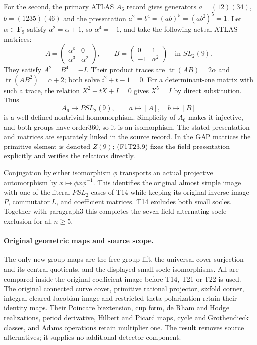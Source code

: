 For the second, the primary ATLAS \(A_6\) record
gives generators \(a=(12)(34)\),
\(b=(1235)(46)\) and the presentation
\(a^2=b^4=(ab)^5=(ab^2)^5=1\).
Let \(\alpha\in\mathbf F_9\) satisfy
\(\alpha^2=\alpha+1\), so \(\alpha^4=-1\),
and take the following actual ATLAS matrices:
\[
 A=\begin{pmatrix}\alpha^6&0\\\alpha^3&\alpha^2\end{pmatrix},
 \qquad
 B=\begin{pmatrix}0&1\\-1&\alpha^2\end{pmatrix}
                  \quad\text{in }SL_2(9).
 \tag{F1T23.9}
\]
They satisfy \(A^2=B^4=-I\).
Their product traces are
\(\operatorname{tr}(AB)=2\alpha\) and
\(\operatorname{tr}(AB^2)=\alpha+2\);
both solve \(t^2+t-1=0\). For a determinant-one
matrix with such a trace, the relation
\(X^2-tX+I=0\) gives \(X^5=I\) by direct
substitution. Thus
\[
        A_6\longrightarrow PSL_2(9),
                   \qquad a\longmapsto[A],\quad
                          b\longmapsto[B]
 \tag{F1T23.10}
\]
is a well-defined nontrivial homomorphism. Simplicity
of \(A_6\) makes it injective, and both groups
have order360, so it is an isomorphism. The stated
presentation and matrices are separately linked in
the source record. In the GAP matrices the primitive
element is denoted \(Z(9)\); (F1T23.9) fixes the
field presentation explicitly and verifies the
relations directly.

Conjugation by either isomorphism \(\phi\)
transports an actual projective automorphism by
\(x\mapsto\phi x\phi^{-1}\). This identifies
the original almost simple image with one of the
literal \(PSL_2\) cases of T14 while keeping its
original inverse image \(P\), commutator \(L\),
and coefficient matrices. T14 excludes both small
socles. Together with paragraph3 this completes the
seven-field alternating-socle exclusion for all
\(n\ge5\).

\paragraph{Original geometric maps and source scope.}
The only new group maps are the free-group lift,
the universal-cover surjection and its central
quotients, and the displayed small-socle
isomorphisms. All are compared inside the original
coefficient image before T14, T21 or T22 is used.
The original connected curve cover, primitive
rational projector, sixfold corner, integral-cleared
Jacobian image and restricted theta polarization
retain their identity maps. Their Poincare
biextension, cup form, de Rham and Hodge
realizations, period derivative, Hilbert and
Picard maps, cycle and Grothendieck classes, and
Adams operations retain multiplier one. The
result removes source alternatives; it supplies
no additional detector component.
